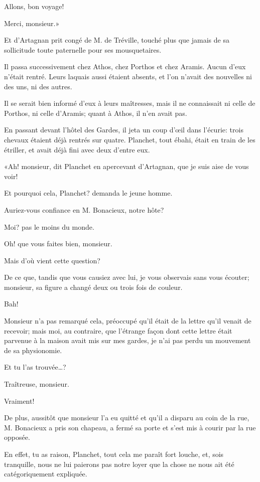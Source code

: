 \speak  Allons, bon voyage! 

\speak  Merci, monsieur.» 

Et d'Artagnan prit congé de M. de Tréville, touché plus que jamais de sa sollicitude toute paternelle pour ses mousquetaires. 

Il passa successivement chez Athos, chez Porthos et chez Aramis. Aucun d'eux n'était rentré. Leurs laquais aussi étaient absents, et l'on n'avait des nouvelles ni des uns, ni des autres. 

Il se serait bien informé d'eux à leurs maîtresses, mais il ne connaissait ni celle de Porthos, ni celle d'Aramis; quant à Athos, il n'en avait pas. 

En passant devant l'hôtel des Gardes, il jeta un coup d'œil dans l'écurie: trois chevaux étaient déjà rentrés sur quatre. Planchet, tout ébahi, était en train de les étriller, et avait déjà fini avec deux d'entre eux. 

«Ah! monsieur, dit Planchet en apercevant d'Artagnan, que je suis aise de vous voir! 

\speak  Et pourquoi cela, Planchet? demanda le jeune homme. 

\speak  Auriez-vous confiance en M. Bonacieux, notre hôte? 

\speak  Moi? pas le moins du monde. 

\speak  Oh! que vous faites bien, monsieur. 

\speak  Mais d'où vient cette question? 

\speak  De ce que, tandis que vous causiez avec lui, je vous observais sans vous écouter; monsieur, sa figure a changé deux ou trois fois de couleur. 

\speak  Bah! 

\speak  Monsieur n'a pas remarqué cela, préoccupé qu'il était de la lettre qu'il venait de recevoir; mais moi, au contraire, que l'étrange façon dont cette lettre était parvenue à la maison avait mis sur mes gardes, je n'ai pas perdu un mouvement de sa physionomie. 

\speak  Et tu l'as trouvée\dots? 

\speak  Traîtreuse, monsieur. 

\speak  Vraiment! 

\speak  De plus, aussitôt que monsieur l'a eu quitté et qu'il a disparu au coin de la rue, M. Bonacieux a pris son chapeau, a fermé sa porte et s'est mis à courir par la rue opposée. 

\speak  En effet, tu as raison, Planchet, tout cela me paraît fort louche, et, sois tranquille, nous ne lui paierons pas notre loyer que la chose ne nous ait été catégoriquement expliquée. 

